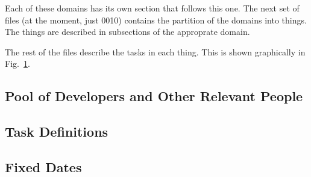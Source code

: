 Each of these domains has its own section that follows this one.
The next set of files (at the moment, just 0010) contains the partition
of the domains into things.  The things are described in subsections of
the approprate domain.

The rest of the files describe the tasks in each thing.  This is shown
graphically in Fig.~\ref{fig:umlclass}.
\begin{figure}[h!]%
\captionsetup{width=0.6\linewidth}
\label{fig:umlclass}
\end{figure}

\subsection{Pool of Developers and Other Relevant People}


\subsection{Task Definitions}


\subsection{Fixed Dates}


%
%
